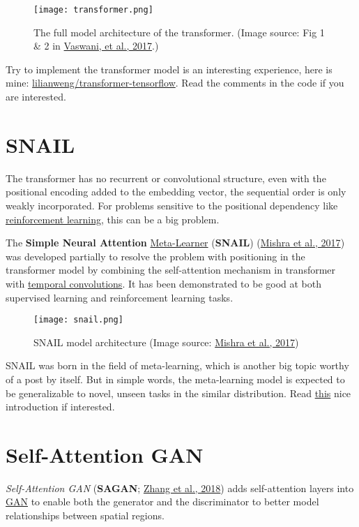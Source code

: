 \documentclass[12pt]{article}
\begin{document}
\begin{figure}[H]
    \centering
    \texttt{[image: transformer.png]}
    \caption{The full model architecture of the transformer. (Image source: Fig 1 \& 2 in \href{http://papers.nips.cc/paper/7181-attention-is-all-you-need.pdf}{Vaswani, et al., 2017}.)}
\end{figure}

Try to implement the transformer model is an interesting experience, here is mine: \href{https://github.com/lilianweng/transformer-tensorflow}{lilianweng/transformer-tensorflow}. Read the comments in the code if you are interested.

\section{SNAIL}
The transformer has no recurrent or convolutional structure, even with the positional encoding added to the embedding vector, the sequential order is only weakly incorporated. For problems sensitive to the positional dependency like \href{https://lilianweng.github.io/posts/2018-02-19-rl-overview/}{reinforcement learning}, this can be a big problem.

The \textbf{Simple Neural Attention} \href{http://bair.berkeley.edu/blog/2017/07/18/learning-to-learn/}{Meta-Learner} (\textbf{SNAIL}) (\href{http://metalearning.ml/papers/metalearn17_mishra.pdf}{Mishra et al., 2017}) was developed partially to resolve the problem with positioning in the transformer model by combining the self-attention mechanism in transformer with \href{https://deepmind.com/blog/wavenet-generative-model-raw-audio/}{temporal convolutions}. It has been demonstrated to be good at both supervised learning and reinforcement learning tasks.

\begin{figure}[H]
    \centering
    \texttt{[image: snail.png]}
    \caption{SNAIL model architecture (Image source: \href{http://metalearning.ml/papers/metalearn17_mishra.pdf}{Mishra et al., 2017})}
\end{figure}

SNAIL was born in the field of meta-learning, which is another big topic worthy of a post by itself. But in simple words, the meta-learning model is expected to be generalizable to novel, unseen tasks in the similar distribution. Read \href{http://bair.berkeley.edu/blog/2017/07/18/learning-to-learn/}{this} nice introduction if interested.

\section{Self-Attention GAN}
\emph{Self-Attention GAN} (\textbf{SAGAN}; \href{https://arxiv.org/pdf/1805.08318.pdf}{Zhang et al., 2018}) adds self-attention layers into \href{https://lilianweng.github.io/posts/2017-08-20-gan/}{GAN} to enable both the generator and the discriminator to better model relationships between spatial regions.
\end{document}
